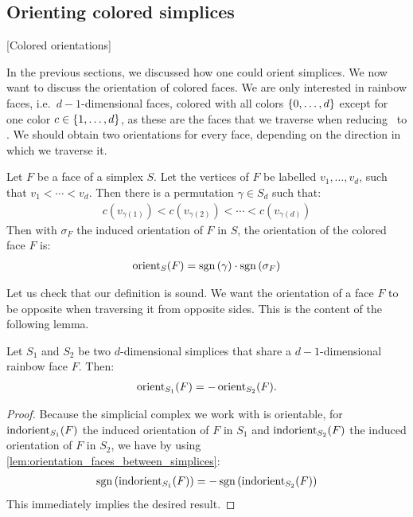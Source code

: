 \subsection{Orienting colored simplices}[Colored orientations]

In the previous sections, we discussed how one could orient simplices. We now want to discuss the orientation of colored faces. We are only interested in rainbow faces, i.e.~$d-1$-dimensional faces, colored with all colors $\left\{0, \dots, d\right\}$ except for one color $c \in \left\{1, \dots, d\right\}$, as these are the faces that we traverse when reducing \Sperner\ to \EndOfLine. We should obtain two orientations for every face, depending on the direction in which we traverse it.

\begin{definition}
	Let $F$ be a face of a simplex $S$. Let the vertices of $F$ be labelled $v_1, \dots, v_d$, such that $v_1 < \cdots < v_d$. Then there is a permutation $\gamma \in S_d$ such that:
	\begin{align*}
		c(v_{\gamma(1)}) < c(v_{\gamma(2)}) < \cdots < c(v_{\gamma(d)})
	\end{align*}
	Then with $\sigma_F$ the induced orientation of $F$ in $S$, the orientation of the colored face $F$ is:
	\begin{align*}
		\operatorname{orient}_S(F) = \operatorname{sgn}\left(\gamma\right) \cdot \operatorname{sgn}\left(\sigma_F\right)
	\end{align*}
\end{definition}

Let us check that our definition is sound. We want the orientation of a face $F$ to be opposite when traversing it from opposite sides. This is the content of the following lemma.

\begin{lemma}\label{lem:soundness_of_colored_orientability}
	Let $S_1$ and $S_2$ be two $d$-dimensional simplices that share a $d-1$-dimensional rainbow face $F$. Then:
	\begin{align*}
		\operatorname{orient}_{S_1}(F) = - \operatorname{orient}_{S_2}(F).
	\end{align*}
\end{lemma}
\begin{proof}
	Because the simplicial complex we work with is orientable, for $\operatorname{indorient}_{S_1}(F)$ the induced orientation of $F$ in $S_1$ and $\operatorname{indorient}_{S_2}(F)$ the induced orientation of $F$ in $S_2$, we have by using \cref{lem:orientation_faces_between_simplices}:
	\begin{align*}
		\operatorname{sgn}\left(\operatorname{indorient}_{S_1}(F)\right) = - \operatorname{sgn}\left(\operatorname{indorient}_{S_2}(F)\right)
	\end{align*}
	This immediately implies the desired result.
\end{proof}

